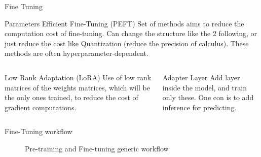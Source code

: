\begin{frame}{Fine Tuning}

    \begin{block}{Parameters Efficient Fine-Tuning (PEFT)}
    Set of methods aims to reduce the computation cost of fine-tuning. Can change the structure like the 2 following, or just reduce the cost like Quantization (reduce the precision of calculus). These methods are often hyperparameter-dependent.
    \end{block}
    
    \begin{columns}  
  
        \begin{column}[t]{0.45\textwidth}
        \begin{block}{Low Rank Adaptation (LoRA)\cite{hu2021loralowrankadaptationlarge}}
                   Use of low rank matrices of the weights matrices, which will be the only ones trained, to reduce the cost of gradient computations.  
        \end{block}
        \end{column}
    
        \begin{column}[t]{0.45\textwidth}
        \begin{block}{Adapter Layer}
            Add layer inside the model, and train only these. One con is to add inference for predicting.
            
        \end{block}
        \end{column}
      
    \end{columns}

\end{frame}


\begin{frame}{Fine-Tuning workflow}
    
    \begin{figure}
        \centering
        
        \caption{Pre-training and Fine-tuning generic workflow}
    \end{figure}  
        

    
\end{frame}

